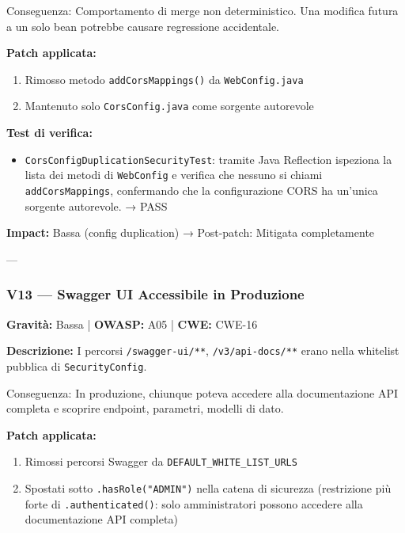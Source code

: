 \documentclass[12pt, a4paper]{article}
\begin{document}
    Conseguenza: Comportamento di merge non deterministico. Una modifica futura a un solo
    bean potrebbe causare regressione accidentale.

    \textbf{Patch applicata:}
    \begin{enumerate}
        \item Rimosso metodo \texttt{addCorsMappings()} da \texttt{WebConfig.java}
        \item Mantenuto solo \texttt{CorsConfig.java} come sorgente autorevole
    \end{enumerate}

    \textbf{Test di verifica:}
    \begin{itemize}
        \item \texttt{CorsConfigDuplicationSecurityTest}: tramite Java Reflection ispeziona la lista
        dei metodi di \texttt{WebConfig} e verifica che nessuno si chiami \texttt{addCorsMappings},
        confermando che la configurazione CORS ha un'unica sorgente autorevole. → \checkmark{} PASS
    \end{itemize}

    \textbf{Impact:} Bassa (config duplication) → Post-patch: Mitigata completamente

    ---

    \subsubsection{V13 — Swagger UI Accessibile in Produzione}

    \textbf{Gravità:} Bassa | \textbf{OWASP:} A05 | \textbf{CWE:} CWE-16

    \textbf{Descrizione:} I percorsi \texttt{/swagger-ui/**}, \texttt{/v3/api-docs/**}
    erano nella whitelist pubblica di \texttt{SecurityConfig}.

    Conseguenza: In produzione, chiunque poteva accedere alla documentazione API completa
    e scoprire endpoint, parametri, modelli di dato.

    \textbf{Patch applicata:}
    \begin{enumerate}
        \item Rimossi percorsi Swagger da \texttt{DEFAULT\_WHITE\_LIST\_URLS}
        \item Spostati sotto \texttt{.hasRole("ADMIN")} nella catena di sicurezza
        (restrizione più forte di \texttt{.authenticated()}: solo amministratori
        possono accedere alla documentazione API completa)
    \end{enumerate}
\end{document}
